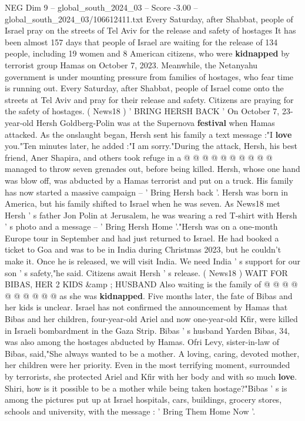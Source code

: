 \begin{textsample}{NEG Dim 9 – global\_south\_2024\_03 – Score -3.00 – global\_south\_2024\_03/106612411.txt}  \label{ex:f9_neg_376}
Every Saturday, after Shabbat, people of Israel pray on the streets of Tel Aviv for the release and safety of hostages It has been almost 157 days that people of Israel are waiting for the release of 134 people, including 19 women and 8 American citizens, who were \textbf{kidnapped} by terrorist group Hamas on October 7, 2023.
Meanwhile, the Netanyahu government is under mounting pressure from families of hostages, who fear time is running out.
Every Saturday, after Shabbat, people of Israel come onto the streets at Tel Aviv and pray for their release and safety.
Citizens are praying for the safety of hostages. ( News18 ) ' BRING HERSH BACK ' On October 7, 23-year-old Hersh Goldberg-Polin was at the Supernova \textbf{festival} when Hamas attacked.
As the onslaught began, Hersh sent his family a text message :"I \textbf{love} you."Ten minutes later, he added :"I am sorry."During the attack, Hersh, his best friend, Aner Shapira, and others took refuge in a @ @ @ @ @ @ @ @ @ @ managed to throw seven grenades out, before being killed.
Hersh, whose one hand was blow off, was abducted by a Hamas terrorist and put on a truck.
His family has now started a massive campaign -- ' Bring Hersh back '.
Hersh was born in America, but his family shifted to Israel when he was seven.
As News18 met Hersh ' s father Jon Polin at Jerusalem, he was wearing a red T-shirt with Hersh ' s photo and a message -- ' Bring Hersh Home '."Hersh was on a one-month Europe tour in September and had just returned to Israel.
He had booked a ticket to Goa and was to be in India during Christmas 2023, but he couldn't make it.
Once he is released, we will visit India.
We need India ' s support for our son ' s safety,"he said.
Citizens await Hersh ' s release. ( News18 ) WAIT FOR BIBAS, HER 2 KIDS \&amp ; HUSBAND Also waiting is the family of @ @ @ @ @ @ @ @ @ @ as she was \textbf{kidnapped}.
Five months later, the fate of Bibas and her kids is unclear.
Israel has not confirmed the announcement by Hamas that Bibas and her children, four-year-old Ariel and now one-year-old Kfir, were killed in Israeli bombardment in the Gaza Strip.
Bibas ' s husband Yarden Bibas, 34, was also among the hostages abducted by Hamas.
Ofri Levy, sister-in-law of Bibas, said,"She always wanted to be a mother.
A loving, caring, devoted mother, her children were her priority.
Even in the most terrifying moment, surrounded by terrorists, she protected Ariel and Kfir with her body and with so much \textbf{love}.
Shiri, how is it possible to be a mother while being taken hostage?"Bibas ' s is among the pictures put up at Israel hospitals, cars, buildings, grocery stores, schools and university, with the message : ' Bring Them Home Now '.

\end{textsample}
